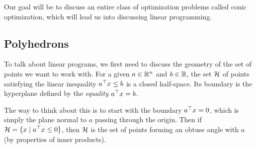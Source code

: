 \documentclass[11 pt]{scrartcl}
\begin{document}
Our goal will be to discuss an entire class of optimization problems called conic optimization, which will lead us into discussing linear programming.

\subsection{Polyhedrons}
To talk about linear programs, we first need to discuss the geometry of the set of points we want to work with. 
For a given $a\in \mathbb R^n$ and $b\in \mathbb R$, the set $\mathcal H$ of points satisfying the linear inequality $a^\top x \leq b$ is a closed half-space. 
Its boundary is the hyperplane defined by the \emph{equality} $a^\top x = b$. 

The way to think about this is to start with the boundary $a^\top x=0$, which is simply the plane normal to $a$ passing through the origin. 
Then if $\mathcal H = \{x\; |\; a^\top x \leq 0\}$, then $\mathcal H$ is the set of points forming an obtuse angle with $a$ (by properties of inner products). 
\end{document}
